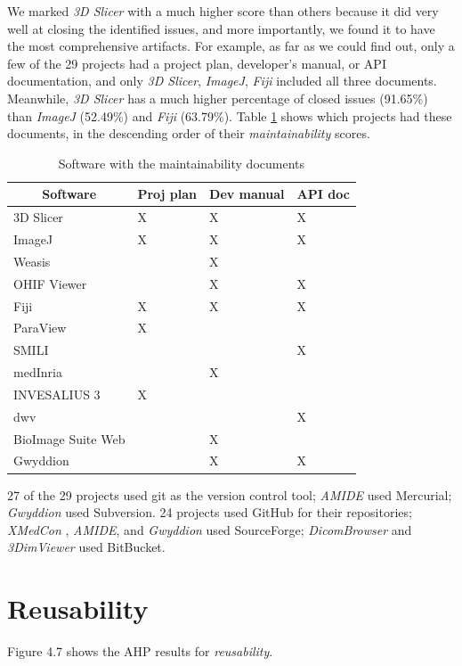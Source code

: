We marked \textit{3D Slicer} with a much higher score than others because it did very well at closing the identified issues, and more importantly, we found it to have the most comprehensive artifacts. For example, as far as we could find out, only a few of the 29 projects had a project plan, developer's manual, or API documentation, and only \textit{3D Slicer}, \textit{ImageJ}, \textit{Fiji} included all three documents. Meanwhile, \textit{3D Slicer} has a much higher percentage of closed issues (91.65\%) than \textit{ImageJ} (52.49\%) and \textit{Fiji} (63.79\%). Table \ref{tab_maintainability_docs} shows which projects had these documents, in the descending order of their \textit{maintainability} scores.

\begin{table}[H]
\centering
\begin{tabular}{llll}
\hline
\multicolumn{1}{c}{Software} & Proj plan & Dev manual & API doc \\ \hline
3D Slicer & X & X & X \\
ImageJ & X & X & X \\
Weasis &  & X &  \\
OHIF Viewer &  & X & X \\
Fiji & X & X & X \\
ParaView & X &  &  \\
SMILI &  &  & X \\
medInria &  & X &  \\
INVESALIUS 3 & X &  &  \\
dwv &  &  & X \\
BioImage Suite Web &  & X &  \\
Gwyddion &  & X & X \\ \hline
\end{tabular}
\caption{\label{tab_maintainability_docs}Software with the maintainability documents}
\end{table}

27 of the 29 projects used git as the version control tool; \textit{AMIDE} used Mercurial; \textit{Gwyddion} used Subversion. 24 projects used GitHub for their repositories; \textit{XMedCon
}, \textit{AMIDE}, and \textit{Gwyddion} used SourceForge; \textit{DicomBrowser} and \textit{3DimViewer} used BitBucket.

\section{Reusability}
Figure 4.7 shows the AHP results for \textit{reusability}.

